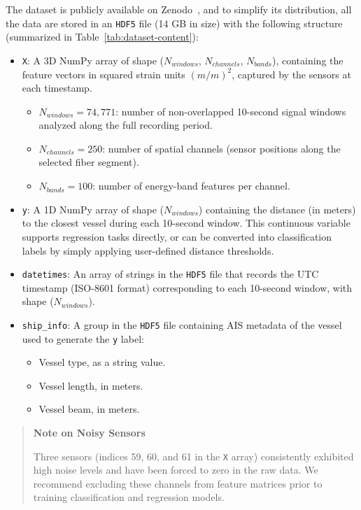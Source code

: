 \documentclass[11pt]{article}
\begin{document}
The dataset is publicly available on Zenodo~\cite{ramirez2024dasvesseldataset}, and to simplify its distribution, all the data are stored in an \texttt{HDF5} file (14 GB in size) with the following structure (summarized in Table~\ref{tab:dataset-content}):
\begin{itemize}
  \item \texttt{X}: A 3D NumPy array of shape {($N_{windows}$, $N_{channels}$, $N_{bands}$)}, containing the feature vectors in squared strain units $(m/m)^2$, captured by the sensors at each timestamp.
  \begin{itemize}
    \item \textbf{{$N_{windows}=74{,}771$}}: number of non-overlapped 10-second signal windows analyzed along the full recording period.
    \item \textbf{{$N_{channels}=250$}}: number of spatial channels (sensor positions along the selected fiber segment).
    \item \textbf{{$N_{bands}=100$}}: number of energy-band features per channel.
  \end{itemize}

  \item \texttt{y}: A 1D NumPy array of shape {($N_{windows}$)} containing the distance (in meters) to the closest vessel during each 10-second window. This continuous variable supports regression tasks directly, or can be converted into classification labels by simply applying user-defined distance thresholds.

  \item \texttt{datetimes}: An array of strings in the \texttt{HDF5} file that records the UTC timestamp (ISO-8601 format) corresponding to each 10-second window, with shape {($N_{windows}$)}.

  \item \texttt{ship\_info}: A group in the \texttt{HDF5} file containing AIS metadata of the vessel used to generate the \texttt{y} label:
        \begin{itemize}
          \item Vessel type, as a string value.
          \item Vessel length, in meters.
          \item Vessel beam, in meters.
        \end{itemize}
\end{itemize}

\begin{quote}
\textbf{Note on Noisy Sensors}

Three sensors (indices 59, 60, and 61 in the \texttt{X} array) consistently exhibited high noise levels and have been forced to zero in the raw data. We recommend excluding these channels from feature matrices prior to training classification and regression models.
\end{quote}
\end{document}
